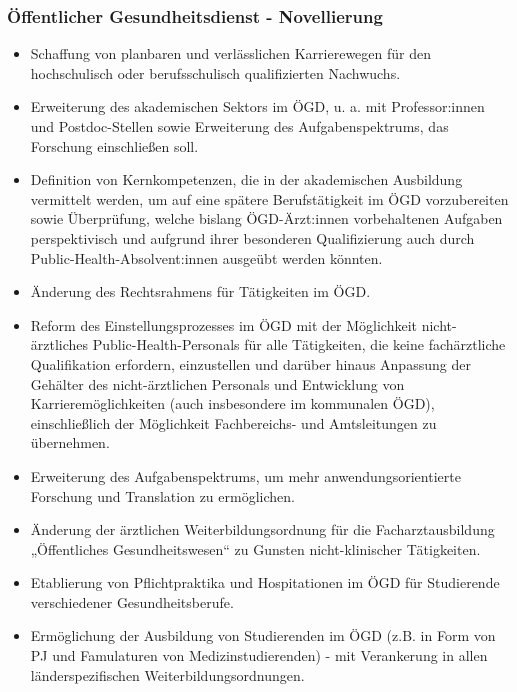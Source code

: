 \documentclass{article}
\begin{document}
\subsubsection{Öffentlicher Gesundheitsdienst - Novellierung}\label{H5760223}


\begin{itemize}
\item Schaffung von planbaren und verlässlichen Karrierewegen für den hochschulisch oder berufsschulisch qualifizierten Nachwuchs.


\item Erweiterung des akademischen Sektors im ÖGD, u. a. mit Professor:innen und Postdoc-Stellen sowie Erweiterung des Aufgabenspektrums, das Forschung einschließen soll.


\item Definition von Kernkompetenzen, die in der akademischen Ausbildung vermittelt werden, um auf eine spätere Berufstätigkeit im ÖGD vorzubereiten sowie Überprüfung, welche bislang ÖGD-Ärzt:innen vorbehaltenen Aufgaben perspektivisch und aufgrund ihrer besonderen Qualifizierung auch durch Public-Health-Absolvent:innen ausgeübt werden könnten.


\item Änderung des Rechtsrahmens für Tätigkeiten im ÖGD.


\item Reform des Einstellungsprozesses im ÖGD mit der Möglichkeit nicht-ärztliches Public-Health-Personals für alle Tätigkeiten, die keine fachärztliche Qualifikation erfordern, einzustellen und darüber hinaus Anpassung der Gehälter des nicht-ärztlichen Personals und Entwicklung von Karrieremöglichkeiten (auch insbesondere im kommunalen ÖGD), einschließlich der Möglichkeit Fachbereichs- und Amtsleitungen zu übernehmen.


\item Erweiterung des Aufgabenspektrums, um mehr anwendungsorientierte Forschung und Translation zu ermöglichen.


\item Änderung der ärztlichen Weiterbildungsordnung für die Facharztausbildung „Öffentliches Gesundheitswesen“ zu Gunsten nicht-klinischer Tätigkeiten.


\item Etablierung von Pflichtpraktika und Hospitationen im ÖGD für Studierende verschiedener Gesundheitsberufe.


\item Ermöglichung der Ausbildung von Studierenden im ÖGD (z.B. in Form von PJ und Famulaturen von Medizinstudierenden) - mit Verankerung in allen länderspezifischen Weiterbildungsordnungen.



\end{itemize}
\end{document}
